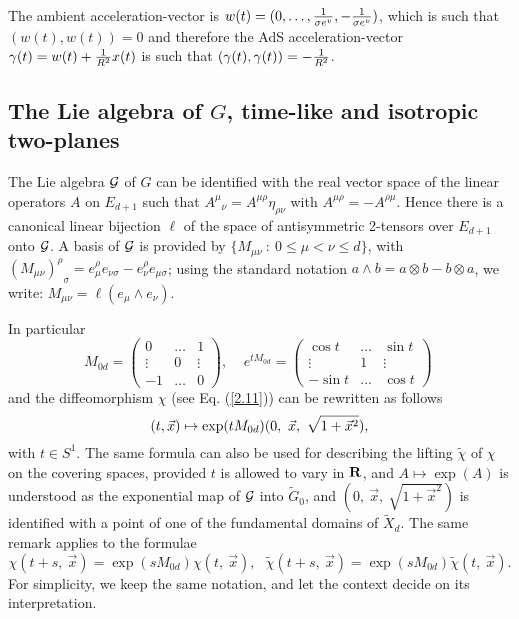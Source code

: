 \documentclass[a4paper,a4paper]{article}
\def\bR{{\bf R}}
\def\GG{{\cal G}}
\def\wt{\widetilde}
\def\wXd{{\wt X_d}}
\def\amb{E_{d+1}}
\def\wchi{{\wt \chi}}
\begin{document}
The ambient acceleration-vector is $w(t)= (0,\ldots,
{1\over \sigma e^v},
-{1\over \sigma e^v})$, which is such that
$(w(t),w(t))=0$ and therefore the AdS acceleration-vector
$\gamma(t) = w(t) +{1\over R^2} x(t)$ is such that
$ (\gamma(t),\gamma(t)) =
 -{1\over R^2}$.


\subsection{The Lie algebra of $G$, time-like and isotropic two-planes}

The Lie algebra $\GG$ of $G$ can be identified with the real vector
space of the linear operators $A$ on $\amb$
such that ${A^\mu}_\nu = A^{\mu \rho}\eta_{\rho \nu}$ with
$A^{\mu \rho} = -A^{\rho \mu}$.
Hence there is a canonical linear bijection $\ell$ of the
space of antisymmetric 2-tensors over $\amb$ onto $\GG$.
A basis of $\GG$ is
provided by $\{M_{\mu \nu}\ :\ 0 \le \mu < \nu \le d\}$, with
${(M_{\mu \nu})^\rho}_\sigma = e_\mu^\rho e_{\nu \sigma}
-e_\nu^\rho e_{\mu \sigma}$;
using the standard notation
$a \wedge b = a \otimes b
- b \otimes a$, we write:
$M_{\mu \nu} = \ell(e_\mu \wedge e_\nu)$.


In particular
\begin{equation}
M_{0d} = \left (
\begin{array}{ccc}
0 & \ldots & 1 \\
\vdots & 0 & \vdots \\
-1 & \ldots & 0
\end{array}
\right ),\ \ \ \ \ e^{tM_{0d}} = \left (
\begin{array}{ccc}
\cos t & \ldots & \sin t\\
\vdots & 1 & \vdots \\
-\sin t & \ldots & \cos t
\end{array}
\right )\
\label{2.4}\end{equation}
and the diffeomorphism $\chi$ (see Eq. (\ref{2.11})) can be
rewritten as follows
\begin{equation}
(t,\vec x) \mapsto {\rm exp}(t M_{0d})(0,\ \vec{x},\
\sqrt {1+ {\vec{x}}^2}),
\label{diffLie}
\label{2.4.a}\end{equation}
with $t \in S^1$.
The same formula can also be used for describing the lifting $\wchi$
of $\chi$ on the covering spaces, provided $t$ is allowed to vary in $\bR$,
and $A \mapsto \exp(A)$ is understood as the exponential
map of $\GG$ into $\wt G_0$, and $(0,\ \vec{x},\
\sqrt {1+ {\vec{x}}^2})$ is identified with a point of one
of the fundamental domains of $\wXd$. The same remark applies to
the formulae
\begin{equation}
\chi(t+s,\ \vec{x}) =
\exp(s M_{0d})\chi(t,\ \vec{x}),\ \ \
\wchi(t+s,\ \vec{x}) =
\exp(s M_{0d})\wchi(t,\ \vec{x}).
\label{2.4.b}\end{equation}
For simplicity, we keep the
same notation, and let the context decide on its interpretation.
\end{document}
